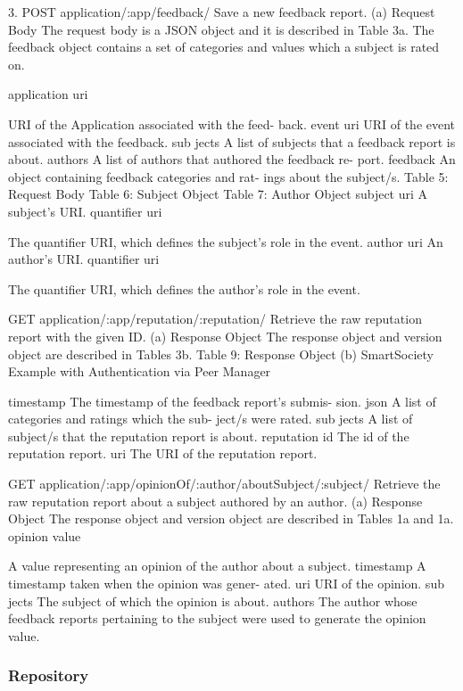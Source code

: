 3. POST application/:app/feedback/ Save a new feedback report. (a) Request Body
The request body is a JSON object and it is described in Table 3a. The feedback object contains a set of categories and values which a subject is rated on.

application uri
 
URI of the Application associated with the feed- back.
event uri
URI of the event associated with the feedback.
sub jects
A list of subjects that a feedback report is about.
authors
A list of authors that authored the feedback re- port.
feedback
An object containing feedback categories and rat- ings about the subject/s.
Table 5: Request Body
Table 6: Subject Object
Table 7: Author Object
subject uri
A subject’s URI.
quantifier uri
 
The quantifier URI, which defines the subject’s role in the event.
author uri
An author’s URI.
quantifier uri
 
The quantifier URI, which defines the author’s role in the event.


GET application/:app/reputation/:reputation/ Retrieve the raw reputation report with the given ID.
(a) Response Object
The response object and version object are described in Tables 3b.
Table 9: Response Object
(b) SmartSociety Example with Authentication via Peer Manager
 
timestamp
The timestamp of the feedback report’s submis- sion.
json
A list of categories and ratings which the sub- ject/s were rated.
sub jects
A list of subject/s that the reputation report is about.
reputation id
The id of the reputation report.
uri
The URI of the reputation report.


GET application/:app/opinionOf/:author/aboutSubject/:subject/ Retrieve the raw reputation report about a subject authored by an author.
(a) Response Object
The response object and version object are described in Tables 1a and 1a.
opinion value
 
A value representing an opinion of the author about a subject.
timestamp
A timestamp taken when the opinion was gener- ated.
uri
URI of the opinion.
sub jects
The subject of which the opinion is about.
authors
The author whose feedback reports pertaining to the subject were used to generate the opinion value.


\subsubsection{Repository}